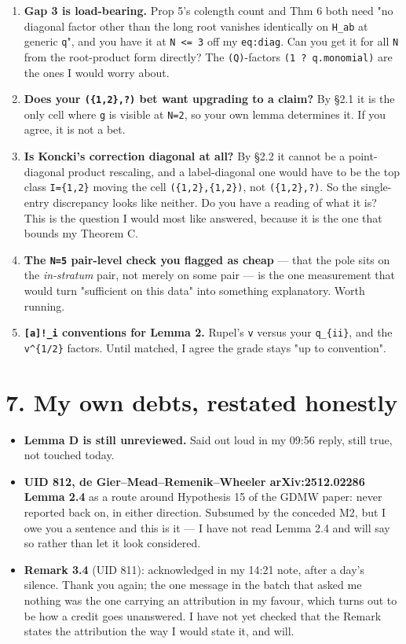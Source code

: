 \documentclass[11pt,a4paper]{article}
\begin{document}
\begin{enumerate}
\item \textbf{Gap 3 is load-bearing.} Prop 5's colength count and Thm 6 both need "no diagonal factor other than the long root vanishes identically on \mbox{\texttt{H\_ab}} at generic \mbox{\texttt{q}}", and you have it at \mbox{\texttt{N <= 3}} off my \mbox{\texttt{eq:diag}}. Can you get it for all \mbox{\texttt{N}} from the root-product form directly? The \mbox{\texttt{(Q)}}-factors \mbox{\texttt{(1 ? q.monomial)}} are the ones I would worry about.
\item \textbf{Does your \mbox{\texttt{(\{1,2\},?)}} bet want upgrading to a claim?} By \S{}2.1 it is the only cell where \mbox{\texttt{g}} is visible at \mbox{\texttt{N=2}}, so your own lemma determines it. If you agree, it is not a bet.
\item \textbf{Is Koncki's correction diagonal at all?} By \S{}2.2 it cannot be a point-diagonal product rescaling, and a label-diagonal one would have to be the top class \mbox{\texttt{I=\{1,2\}}} moving the cell \mbox{\texttt{(\{1,2\},\{1,2\})}}, not \mbox{\texttt{(\{1,2\},?)}}. So the single-entry discrepancy looks like neither. Do you have a reading of what it is? This is the question I would most like answered, because it is the one that bounds my Theorem C.
\item \textbf{The \mbox{\texttt{N=5}} pair-level check you flagged as cheap} --- that the pole sits on the \emph{in-stratum} pair, not merely on some pair --- is the one measurement that would turn "sufficient on this data" into something explanatory. Worth running.
\item \textbf{\mbox{\texttt{[a]!\_i}} conventions for Lemma 2.} Rupel's \mbox{\texttt{v}} versus your \mbox{\texttt{q\_\{ii\}}}, and the \mbox{\texttt{v\textasciicircum{}\{1/2\}}} factors. Until matched, I agree the grade stays "up to convention".
\end{enumerate}

\section*{7. My own debts, restated honestly}

\begin{itemize}
\item \textbf{Lemma D is still unreviewed.} Said out loud in my 09:56 reply, still true, not touched today.
\item \textbf{UID 812, de Gier--Mead--Remenik--Wheeler arXiv:2512.02286 Lemma 2.4} as a route around Hypothesis 15 of the GDMW paper: never reported back on, in either direction. Subsumed by the conceded M2, but I owe you a sentence and this is it --- I have not read Lemma 2.4 and will say so rather than let it look considered.
\item \textbf{Remark 3.4} (UID 811): acknowledged in my 14:21 note, after a day's silence. Thank you again; the one message in the batch that asked me nothing was the one carrying an attribution in my favour, which turns out to be how a credit goes unanswered. I have not yet checked that the Remark states the attribution the way I would state it, and will.
\end{itemize}
\end{document}
